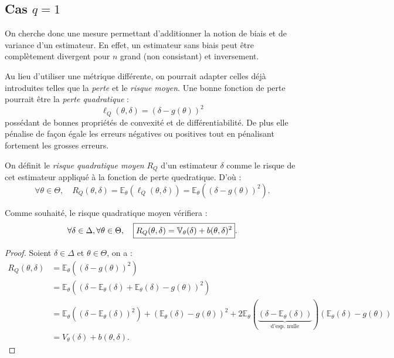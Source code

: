 \subsection{Cas $q = 1$}

On cherche donc une mesure permettant d'additionner la notion de biais et de 
variance d'un estimateur. En effet, un estimateur sans biais peut être complètement 
divergent pour $n$ grand (non consistant) et inversement. 

Au lieu d'utiliser une métrique différente, on pourrait adapter celles 
déjà introduites telles que la \emph{perte} et le \emph{risque moyen}. Une bonne fonction 
de perte pourrait être la \emph{perte quadratique} : 
    $$ \ell_Q(\theta, \delta) = ( \delta - g(\theta))^2 $$ 
possédant de bonnes propriétés de convexité et de différentiabilité. De plus elle pénalise 
de façon égale les erreurs négatives ou positives tout en pénalisant fortement les grosses erreurs. 

\begin{definition}
    On définit le \emph{risque quadratique moyen} $ R_Q$ d'un estimateur $ \delta$ 
    comme le risque de cet estimateur appliqué à la fonction de perte quedratique. 
    D'où : 
        $$ \forall \theta \in \Theta, \quad 
            R_Q(\theta, \delta) = \mathbb{E}_\theta(\ell_Q(\theta, \delta)) = \mathbb{E}_\theta((\delta - g(\theta))^2). 
        $$
\end{definition}

\begin{prop}[Décomposition]
    Comme souhaité, le risque quadratique moyen vérifiera : 
        $$ \forall \delta \in \Delta, \forall \theta \in \Theta, \quad 
            \boxed{ R_Q(\theta, \delta) = \mathbb{V}_\theta(\delta) + b(\theta, \delta)^2}.
        $$
\end{prop}

\begin{proof}
    Soient $ \delta \in \Delta$ et $ \theta \in \Theta$, on a : 
        \begin{align*}
            R_Q(\theta, \delta) &= \mathbb{E}_\theta((\delta - g(\theta))^2) \\ 
            &= \mathbb{E}_\theta((\delta - \mathbb{E}_\theta(\delta) + \mathbb{E}_\theta(\delta) - g(\theta))^2) \\
            &= \mathbb{E}_\theta((\delta - \mathbb{E}_\theta(\delta))^2) + \left( \mathbb{E}_\theta(\delta) - g(\theta)\right)^2 
                + 2 \mathbb{E}_\theta(\underbrace{(\delta - \mathbb{E}_\theta(\delta))}_{\text{d'esp. nulle}}) \left( \mathbb{E}_\theta(\delta) - g(\theta)\right) \\ 
            &= V_\theta(\delta) + b(\theta, \delta).
        \end{align*}
\end{proof}

